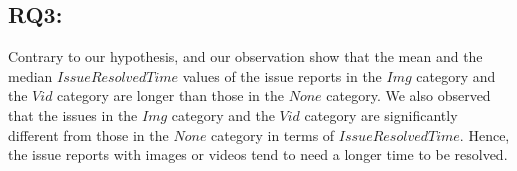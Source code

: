 \subsection*{RQ3: \RQthree{}}


Contrary to our hypothesis,  and our observation show that 
the mean and the median $IssueResolvedTime$ values of 
the issue reports in the $Img$ category and the $Vid$ category are 
longer than those in the $None$ category. 
We also observed that the issues in the $Img$ category and 
the $Vid$ category are significantly different from those 
in the $None$ category in terms of $IssueResolvedTime$.
Hence, the issue reports with images or videos tend to need 
a longer time to be resolved. 

